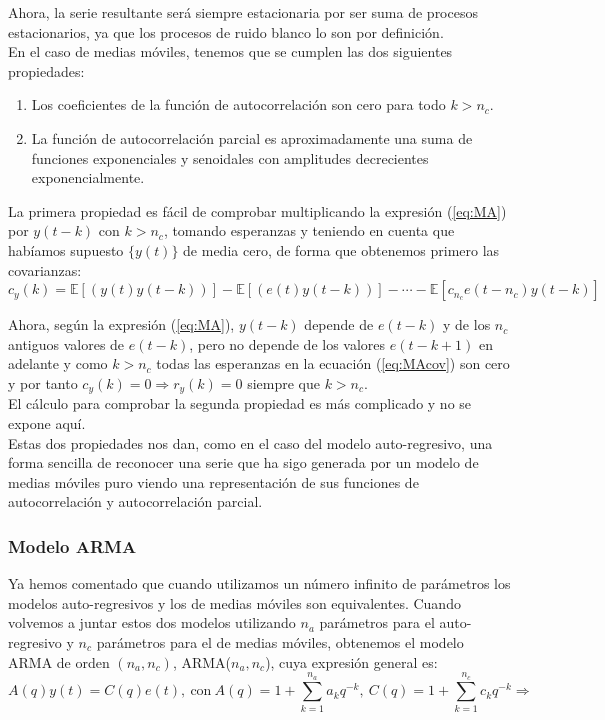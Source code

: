 Ahora, la serie resultante será siempre estacionaria por ser suma de procesos estacionarios, ya que los procesos de ruido blanco lo son por definición.\\

En el caso de medias móviles, tenemos que se cumplen las dos siguientes propiedades:
\begin{enumerate}
\item Los coeficientes de la función de autocorrelación son cero para todo $k>n_c$.
\item La función de autocorrelación parcial es aproximadamente una suma de funciones exponenciales y senoidales con amplitudes decrecientes exponencialmente.
\end{enumerate}

La primera propiedad es fácil de comprobar multiplicando la expresión (\ref{eq:MA}) por $y(t-k)$ con $k>n_c$, tomando esperanzas y teniendo en cuenta que habíamos supuesto $\{y(t)\}$ de media cero, de forma que obtenemos primero las covarianzas:
\begin{equation} \label{eq:MAcov}
	c_y(k) = \mathbb{E}[(y(t)y(t-k))] -  \mathbb{E}[(e(t)y(t-k))] - \cdots - \mathbb{E}[c_{n_c} e(t-n_c) y(t-k)]
\end{equation}

Ahora, según la expresión (\ref{eq:MA}), $y(t-k)$ depende de $e(t-k)$ y de los $n_c$ antiguos valores de $e(t-k)$, pero no depende de los valores $e(t-k+1)$ en adelante y como $k>n_c$ todas las esperanzas en la ecuación (\ref{eq:MAcov}) son cero y por tanto $c_y(k) = 0 \Rightarrow r_y(k) = 0$ siempre que $k>n_c$.\\

El cálculo para comprobar la segunda propiedad es más complicado y no se expone aquí.\\

Estas dos propiedades nos dan, como en el caso del modelo auto-regresivo, una forma sencilla de reconocer una serie que ha sigo generada por un modelo de medias móviles puro viendo una representación de sus funciones de autocorrelación y autocorrelación parcial.

\subsubsection{Modelo ARMA}

Ya hemos comentado que cuando utilizamos un número infinito de parámetros los modelos auto-regresivos y los de medias móviles son equivalentes. Cuando volvemos a juntar estos dos modelos utilizando $n_a$ parámetros para el auto-regresivo y $n_c$ parámetros para el de medias móviles, obtenemos el modelo ARMA de orden $(n_a,n_c)$, ARMA($n_a,n_c$), cuya expresión general es:
\[	A(q)y(t) = C(q)e(t),\ \text{con}\ A(q) = 1 + \sum_{k=1}^{n_a} a_kq^{-k},\ C(q) = 1 + \sum_{k=1}^{n_c} c_k q^{-k} \Rightarrow	\]

